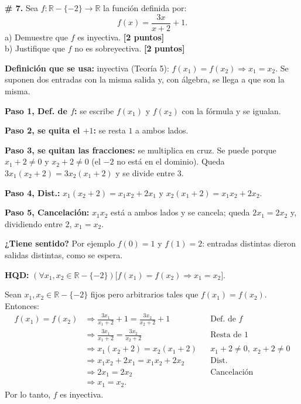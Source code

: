 \documentclass[11pt]{article}
\newcommand{\hl}[1]{\colorbox{green!35}{#1}}
\newcommand{\jus}[1]{&&\text{#1}}
\begin{document}
\textbf{\# 7.} Sea $f:\mathbb R-\{-2\}\to\mathbb R$ la función definida por:
\[f(x)=\frac{3x}{x+2}+1.\]
a) Demuestre que $f$ es \hl{inyectiva}. \hfill\textbf{[2 puntos]}\\
b) Justifique que $f$ \hl{no es sobreyectiva}. \hfill\textbf{[2 puntos]}

\begin{center}
\end{center}


\begin{explica}
\textbf{Definición que se usa:} inyectiva (Teoría 5): $f(x_1)=f(x_2)\Rightarrow x_1=x_2$. Se suponen dos entradas con la misma salida y, con álgebra, se llega a que son la misma.

\textbf{Paso 1, Def. de $f$:} se escribe $f(x_1)$ y $f(x_2)$ con la fórmula y se igualan.

\textbf{Paso 2, se quita el $+1$:} se resta $1$ a ambos lados.

\textbf{Paso 3, se quitan las fracciones:} se multiplica en cruz. Se puede porque $x_1+2\neq0$ y $x_2+2\neq0$ (el $-2$ no está en el dominio). Queda $3x_1(x_2+2)=3x_2(x_1+2)$ y se divide entre $3$.

\textbf{Paso 4, Dist.:} $x_1(x_2+2)=x_1x_2+2x_1$ y $x_2(x_1+2)=x_1x_2+2x_2$.

\textbf{Paso 5, Cancelación:} $x_1x_2$ está a ambos lados y se cancela; queda $2x_1=2x_2$ y, dividiendo entre $2$, $x_1=x_2$.

\textbf{¿Tiene sentido?} Por ejemplo $f(0)=1$ y $f(1)=2$: entradas distintas dieron salidas distintas, como se espera.
\end{explica}

\textbf{HQD:} $(\forall x_1,x_2\in\mathbb R-\{-2\})\big[f(x_1)=f(x_2)\Rightarrow x_1=x_2\big]$.

Sean $x_1,x_2\in\mathbb R-\{-2\}$ fijos pero arbitrarios tales que $f(x_1)=f(x_2)$. Entonces:
\begin{align*}
f(x_1)=f(x_2)&\Rightarrow\frac{3x_1}{x_1+2}+1=\frac{3x_2}{x_2+2}+1\jus{Def. de $f$}\\
&\Rightarrow\frac{3x_1}{x_1+2}=\frac{3x_2}{x_2+2}\jus{Resta de $1$}\\
&\Rightarrow x_1(x_2+2)=x_2(x_1+2)\jus{$x_1+2\neq0,\ x_2+2\neq0$}\\
&\Rightarrow x_1x_2+2x_1=x_1x_2+2x_2\jus{Dist.}\\
&\Rightarrow 2x_1=2x_2\jus{Cancelación}\\
&\Rightarrow x_1=x_2.
\end{align*}
Por lo tanto, $f$ es inyectiva.
\end{document}
